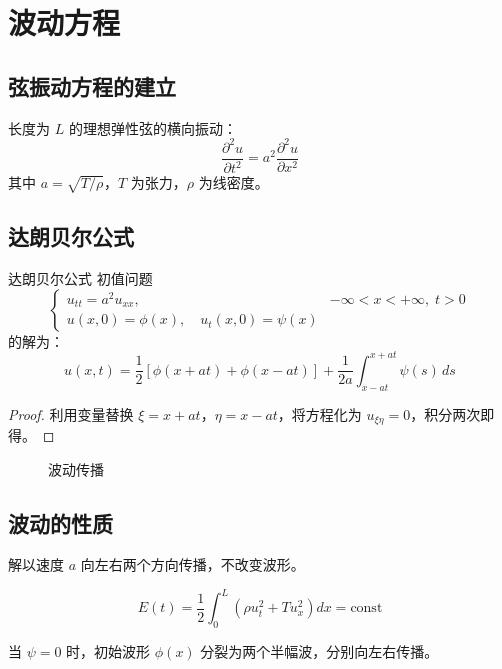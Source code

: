 ﻿\chapter{波动方程}

\section{弦振动方程的建立}

\begin{theorem}[弦振动方程]
长度为 $L$ 的理想弹性弦的横向振动：
\[
\frac{\partial^2 u}{\partial t^2}=a^2\frac{\partial^2 u}{\partial x^2}
\]
其中 $a=\sqrt{T/\rho}$，$T$ 为张力，$\rho$ 为线密度。
\end{theorem}

\section{达朗贝尔公式}

\begin{mydefinition}{达朗贝尔公式}
初值问题
\[
\begin{cases}
u_{tt}=a^2 u_{xx},&-\infty<x<+\infty,\;t>0\\
u(x,0)=\phi(x),\quad u_t(x,0)=\psi(x)
\end{cases}
\]
的解为：
\[
u(x,t)=\frac{1}{2}[\phi(x+at)+\phi(x-at)]+\frac{1}{2a}\int_{x-at}^{x+at}\psi(s)\,ds
\]
\end{mydefinition}

\begin{proof}
利用变量替换 $\xi=x+at$，$\eta=x-at$，将方程化为 $u_{\xi\eta}=0$，积分两次即得。
\end{proof}

\begin{figure}[htbp]
\centering
{}
\caption{波动传播}
\end{figure}

\section{波动的性质}

\begin{proposition}[传播速度]
解以速度 $a$ 向左右两个方向传播，不改变波形。
\end{proposition}

\begin{proposition}[能量守恒]
\[
E(t)=\frac{1}{2}\int_0^L\left(\rho u_t^2+Tu_x^2\right)dx=\text{const}
\]
\end{proposition}

\begin{remark}
当 $\psi=0$ 时，初始波形 $\phi(x)$ 分裂为两个半幅波，分别向左右传播。
\end{remark}
